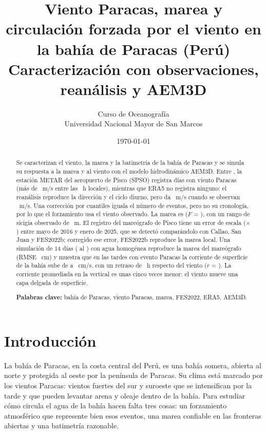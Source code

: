 \documentclass[11pt,a4paper]{article}
\title{\textbf{Viento Paracas, marea y circulación forzada por el viento en la bahía de Paracas (Perú)}\\[0.4em]\large Caracterización con observaciones, reanálisis y AEM3D}
\author{Curso de Oceanografía\\Universidad Nacional Mayor de San Marcos}
\date{\today}
\begin{document}
\maketitle

\begin{abstract}
\noindent
Se caracterizan el viento, la marea y la batimetría de la bahía de Paracas y se simula su respuesta a la
marea y al viento con el modelo hidrodinámico AEM3D. Entre \periodoMeteo, la estación METAR del aeropuerto
de Pisco (SPSO) registra \eventosMetar{} días con viento Paracas (más de \umbralParacas~m/s entre las
\ventanaParacas~h locales), mientras que ERA5 no registra ninguno: el reanálisis reproduce la dirección y el
ciclo diurno, pero da \vientoFuerteEra~m/s cuando se observan \vientoFuerteObs~m/s. Una corrección por
cuantiles iguala el número de eventos, pero no su cronología, por lo que el forzamiento usa el viento observado.
La marea es \claseMarea{} ($F$ = \factorF), con un rango de sicigia observado de \rangoSicigiaObs~m. El registro
del mareógrafo de Pisco tiene un error de escala ($\times$\razonError) entre mayo de 2016 y enero de 2025, que se
detectó comparándolo con Callao, San Juan y FES2022b; corregido ese error, FES2022b reproduce la marea local.
Una simulación de 14 días (\aemInicio{} al \aemFin) con agua homogénea reproduce la marea del mareógrafo
(RMSE \aemRmseIoc~cm) y muestra que en las tardes con evento Paracas la corriente de superficie de la bahía
sube de \corrCalma{} a \corrEvento~cm/s, con un retraso de \rezagoVientoCorr~h respecto del viento
($r$ = \rVientoCorr). La corriente promediada en la vertical es unas cinco veces menor: el viento mueve una
capa delgada de superficie.

\medskip\noindent\textbf{Palabras clave:} bahía de Paracas, viento Paracas, marea, FES2022, ERA5, AEM3D.
\end{abstract}

\section{Introducción}

La bahía de Paracas, en la costa central del Perú, es una bahía somera, abierta al norte y protegida al oeste
por la península de Paracas. Su clima está marcado por los vientos Paracas: vientos fuertes del sur y suroeste
que se intensifican por la tarde y que pueden levantar arena y oleaje dentro de la bahía. Para estudiar cómo
circula el agua de la bahía hacen falta tres cosas: un forzamiento atmosférico que represente bien esos
eventos, una marea confiable en las fronteras abiertas y una batimetría razonable.
\end{document}
